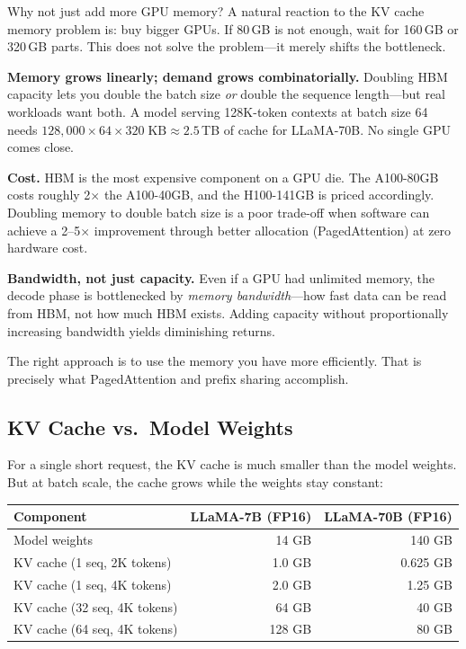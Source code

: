 \begin{whynotbox}{Why not just add more GPU memory?}
A natural reaction to the KV cache memory problem is: buy bigger GPUs. If 80\,GB is not enough, wait for 160\,GB or 320\,GB parts. This does not solve the problem---it merely shifts the bottleneck.

\textbf{Memory grows linearly; demand grows combinatorially.} Doubling HBM capacity lets you double the batch size \emph{or} double the sequence length---but real workloads want both. A model serving 128K-token contexts at batch size 64 needs $128{,}000 \times 64 \times 320\;\text{KB} \approx 2.5$\,TB of cache for LLaMA-70B. No single GPU comes close.

\textbf{Cost.} HBM is the most expensive component on a GPU die. The A100-80GB costs roughly 2$\times$ the A100-40GB, and the H100-141GB is priced accordingly. Doubling memory to double batch size is a poor trade-off when software can achieve a 2--5$\times$ improvement through better allocation (PagedAttention) at zero hardware cost.

\textbf{Bandwidth, not just capacity.} Even if a GPU had unlimited memory, the decode phase is bottlenecked by \emph{memory bandwidth}---how fast data can be read from HBM, not how much HBM exists. Adding capacity without proportionally increasing bandwidth yields diminishing returns.

The right approach is to use the memory you have more efficiently. That is precisely what PagedAttention and prefix sharing accomplish.
\end{whynotbox}

\subsection{KV Cache vs.\ Model Weights}

For a single short request, the KV cache is much smaller than the model weights. But at batch scale, the cache grows while the weights stay constant:
\begin{center}
\begin{tabular}{lrr}
\hline
\textbf{Component} & \textbf{LLaMA-7B (FP16)} & \textbf{LLaMA-70B (FP16)} \\
\hline
Model weights & 14 GB & 140 GB \\
KV cache (1 seq, 2K tokens) & 1.0 GB & 0.625 GB \\
KV cache (1 seq, 4K tokens) & 2.0 GB & 1.25 GB \\
KV cache (32 seq, 4K tokens) & 64 GB & 40 GB \\
KV cache (64 seq, 4K tokens) & 128 GB & 80 GB \\
\hline
\end{tabular}
\end{center}


